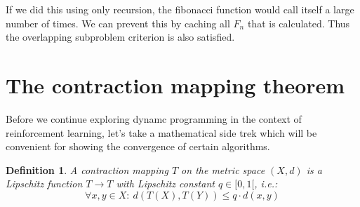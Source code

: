 \documentclass[12pt, a4paper]{article}
\newtheorem{definition}{Definition}[section]
\numberwithin{equation}{section}
\begin{document}
If we did this using only recursion, the fibonacci function would call itself a large number of times. We can prevent this by caching all $F_n$ that is calculated. Thus the overlapping subproblem criterion is also satisfied.

\section{The contraction mapping theorem}
Before we continue exploring dynamc programming in the context of reinforcement learning, let's take a mathematical side trek which will be convenient for showing the convergence of certain algorithms.

\begin{definition}
A contraction mapping $T$ on the metric space $(X,d)$ is a Lipschitz function $T\rightarrow T$ with Lipschitz constant $q\in[0,1[$, i.e.:
\begin{equation}
\forall x,y\in X:\ d(T(X),T(Y))\le q\cdot d(x,y)
\end{equation}
\end{definition}
\end{document}
